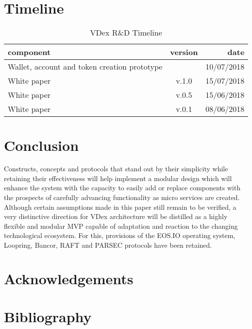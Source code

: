 \documentclass[]{article}
\begin{document}
\paragraph{}	
\section{Timeline}
	
\begin{table}[h!]
	\begin{center}
		\caption{VDex R\&D Timeline}
		\label{tab:table1}
		\begin{tabular}{l|c|r}
			
			\textbf{component} & \textbf{version}&  \textbf{date}  \\
			\hline
			Wallet, account and token creation prototype  &  & 10/07/2018\\
			\hline
			White paper  & v.1.0  & 15/07/2018\\
			\hline
			White paper  & v.0.5 & 15/06/2018\\
			\hline			
			White paper  & v.0.1 & 08/06/2018\\
			\hline
			
			
			
		\end{tabular}
	\end{center}
\end{table}
		
\section{Conclusion}
Constructs, concepts and protocols that stand out by their simplicity
while retaining their effectiveness will help implement a modular
design which will enhance the system with the capacity to easily add or replace components with the prospects of carefully advancing functionality as micro services are created.
Although certain assumptions made in this paper still remain to be verified,
a very distinctive direction for VDex architecture will be distilled as a highly flexible and modular MVP capable of adaptation and reaction to the changing technological ecosystem.
For this, provisions of the EOS.IO operating system, Loopring, Bancor, RAFT and PARSEC protocols have been retained. 


\section*{Acknowledgements}
\section*{Bibliography}



\cite{1}
\cite{2}
\cite{3}
\cite{4}
\cite{5}
\cite{6}
\cite{7}
\cite{8}
\cite{9}
\cite{10}
\cite{11}
\cite{12}
\cite{13}
\cite{14}
\cite{15}
\cite{16}
\cite{17}
\cite{18}
\cite{19}
\cite{20}
\cite{21}


 
\end{document}
